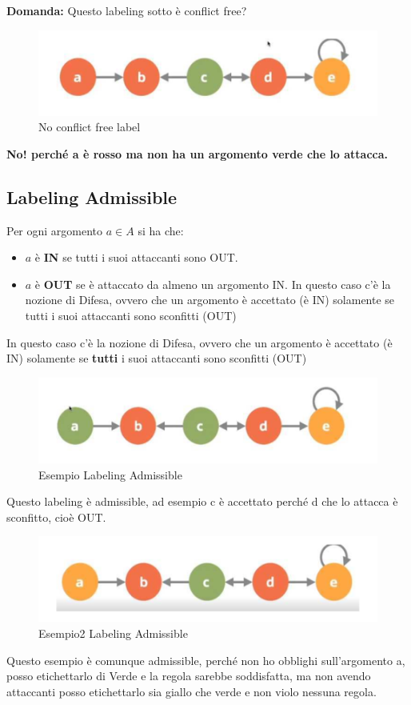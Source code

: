     \textbf{Domanda: } Questo labeling sotto è conflict free?
    \begin{figure}[H]
        \centering
        \includegraphics[width=12cm, keepaspectratio]{img/Cap7/CF3.png}
        \caption{No conflict free label}
    \end{figure}
    \begin{center}
        \textbf{No! perché a è rosso ma non ha un argomento verde che lo attacca.}
    \end{center}
    \newpage
    \subsection{Labeling Admissible}
    Per ogni argomento $a \in A$ si ha che:
    \begin{itemize}
        \item $a$ è \textbf{IN} se tutti i suoi attaccanti sono OUT.
        \item $a$ è \textbf{OUT} se è attaccato da almeno un argomento IN. In questo caso c'è la nozione di Difesa, ovvero che un argomento è accettato (è IN) solamente se tutti i suoi attaccanti sono sconfitti (OUT)
    \end{itemize}
    In questo caso c'è la nozione di Difesa, ovvero che un argomento è accettato (è IN) solamente se \textbf{tutti} i suoi attaccanti sono sconfitti (OUT)
    \begin{figure}[H]
        \centering
        \includegraphics[width=12cm, keepaspectratio]{img/Cap7/LA.png}
        \caption{Esempio Labeling Admissible}
    \end{figure}

    Questo labeling è admissible, ad esempio c è accettato perché d che lo attacca è sconfitto, cioè OUT.
    \begin{figure}[H]
        \centering
        \includegraphics[width=12cm, keepaspectratio]{img/Cap7/LA2.png}
        \caption{Esempio2 Labeling Admissible}
    \end{figure}
    Questo esempio è comunque admissible, perché non ho obblighi sull'argomento a, posso etichettarlo di Verde e la regola sarebbe soddisfatta, ma non avendo attaccanti posso etichettarlo sia giallo che verde e non violo nessuna regola.


